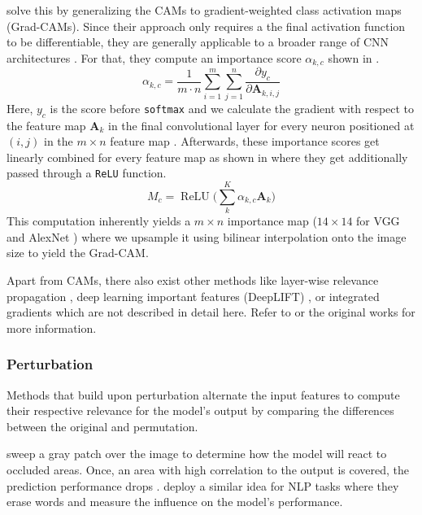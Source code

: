 \citet{SelvarajuCDVPB17} solve this by generalizing the CAMs to gradient-weighted class activation maps (Grad-CAMs). Since their approach only requires a the final activation function to be differentiable, they are generally applicable to a broader range of CNN architectures \citep{SelvarajuCDVPB17, xie2020explainable}. For that, they compute an importance score $\alpha_{k,c}$ shown in .
\begin{equation}
\label{eq:grad_cam_importance}
    \alpha_{k,c} = \frac{1}{m\cdot n}\sum_{i=1}^m\sum_{j=1}^n \frac{\partial y_c}{\partial \mathbf{A}_{k,i,j}}
\end{equation}
Here, $y_c$ is the score before \texttt{softmax} and we calculate the gradient with respect to the feature map $\mathbf{A}_k$ in the final convolutional layer for every neuron positioned at $(i,j)$ in the $m\times n$ feature map \citep{SelvarajuCDVPB17, xie2020explainable}. Afterwards, these importance scores get linearly combined for every feature map as shown in  where they get additionally passed through a \texttt{ReLU} function.
\begin{equation}
\label{eq:grad_cam_map}
    M_c = \operatorname{ReLU}\Big(\sum_k^K \alpha_{k,c} \mathbf{A}_k \Big)
\end{equation}
This computation inherently yields a $m \times n$ importance map ($14 \times 14$ for VGG \citep{SimonyanZ14a} and AlexNet \citep{KrizhevskySH12}) where we upsample it using bilinear interpolation onto the image size to yield the Grad-CAM.

Apart from CAMs, there also exist other methods like layer-wise relevance propagation \citep{MontavonLBSM17, DingLLS17, LapuschkinBMMS16, Bach2015}, deep learning important features (DeepLIFT) \citep{ShrikumarGK17}, or integrated gradients \citep{SundararajanTY17} which are not described in detail here. Refer to \citet{xie2020explainable} or the original works for more information.

\subsubsection{Perturbation}
Methods that build upon perturbation alternate the input features to compute their respective relevance for the model's output by comparing the differences between the original and permutation.

\citet{ZeilerF14} sweep a gray patch over the image to determine how the model will react to occluded areas. Once, an area with high correlation to the output is covered, the prediction performance drops \citep{xie2020explainable, ZeilerF14}. \citet{li2016understanding} deploy a similar idea for NLP tasks where they erase words and measure the influence on the model's performance. \citet{FongV17}



